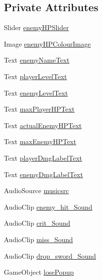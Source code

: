 \subsection*{Private Attributes}
\begin{DoxyCompactItemize}
\item 
Slider \mbox{\hyperlink{class_gameplay_a7d03f69d9d928b307f00ce1b684969c3}{enemy\+H\+P\+Slider}}
\item 
Image \mbox{\hyperlink{class_gameplay_ada260396fe858ad44f0d159845df5f09}{enemy\+H\+P\+Colour\+Image}}
\item 
Text \mbox{\hyperlink{class_gameplay_a369fac38122ccf9d2714d6eeb8e9f4da}{enemy\+Name\+Text}}
\item 
Text \mbox{\hyperlink{class_gameplay_a66d192ecad5474b325ab0166fecca93e}{player\+Level\+Text}}
\item 
Text \mbox{\hyperlink{class_gameplay_a1f9b823605ad5d6bcd5e6510ad8669ff}{enemy\+Level\+Text}}
\item 
Text \mbox{\hyperlink{class_gameplay_a6ccce240e6de8ca0594f2d1dfe9ad381}{max\+Player\+H\+P\+Text}}
\item 
Text \mbox{\hyperlink{class_gameplay_af744284896199a16b0fa180dc271f2e6}{actual\+Enemy\+H\+P\+Text}}
\item 
Text \mbox{\hyperlink{class_gameplay_a3417dd6e842ca2a3ab2a162599d71d43}{max\+Enemy\+H\+P\+Text}}
\item 
Text \mbox{\hyperlink{class_gameplay_af87a6ba5f01b2ca40f099fcc31074d78}{player\+Dmg\+Label\+Text}}
\item 
Text \mbox{\hyperlink{class_gameplay_a5425c9e52ca326252663135eec4aba05}{enemy\+Dmg\+Label\+Text}}
\item 
Audio\+Source \mbox{\hyperlink{class_gameplay_ac0f5f25339c8f9f7ce890b5cb68900af}{musicsrc}}
\item 
Audio\+Clip \mbox{\hyperlink{class_gameplay_accfeede9500530c26e0d05bd9e333894}{enemy\+\_\+hit\+\_\+\+Sound}}
\item 
Audio\+Clip \mbox{\hyperlink{class_gameplay_a8ad8fc709889c1581412a46b5c648f2e}{crit\+\_\+\+Sound}}
\item 
Audio\+Clip \mbox{\hyperlink{class_gameplay_aa5c98178b057b707fd6127c2823c803d}{miss\+\_\+\+Sound}}
\item 
Audio\+Clip \mbox{\hyperlink{class_gameplay_aef5930170ca2cbd77a04c611bc3e81db}{drop\+\_\+sword\+\_\+\+Sound}}
\item 
Game\+Object \mbox{\hyperlink{class_gameplay_a9891285ae11da63d4751760a82a161a4}{lose\+Popup}}
\item 

\end{DoxyCompactItemize}
